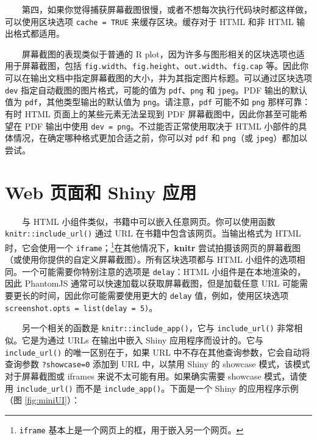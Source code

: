 \documentclass[
  12pt,
]{krantz}
\let\oldhref\href
\renewcommand{\href}[2]{#2\footnote{\url{#1}}}
\theoremstyle{definition}
\theoremstyle{definition}
\theoremstyle{definition}
\theoremstyle{definition}
\theoremstyle{remark}
\begin{document}
  第四，如果你觉得捕获屏幕截图很慢，或者不想每次执行代码块时都这样做，可以使用区块选项 \texttt{cache\ =\ TRUE} 来缓存区块。缓存对于 HTML 和非 HTML 输出格式都适用。

  屏幕截图的表现类似于普通的 R plot，因为许多与图形相关的区块选项也适用于屏幕截图，包括 \texttt{fig.width}、\texttt{fig.height}、\texttt{out.width}、\texttt{fig.cap} 等。因此你可以在输出文档中指定屏幕截图的大小，并为其指定图片标题。可以通过区块选项 \texttt{dev} 指定自动截图的图片格式，可能的值为 \texttt{pdf}、\texttt{png} 和 \texttt{jpeg}。PDF 输出的默认值为 \texttt{pdf}，其他类型输出的默认值为 \texttt{png}。请注意，\texttt{pdf} 可能不如 \texttt{png} 那样可靠：有时 HTML 页面上的某些元素无法呈现到 PDF 屏幕截图中，因此你甚至可能希望在 PDF 输出中使用 \texttt{dev\ =\ \textquotesingle{}png\textquotesingle{}}。不过能否正常使用取决于 HTML 小部件的具体情况，在确定哪种格式更加合适之前，你可以对 \texttt{pdf} 和 \texttt{png}（或 \texttt{jpeg}）都加以尝试。

\hypertarget{web-ux9875ux9762ux548c-shiny-ux5e94ux7528}{%
\section{Web 页面和 Shiny 应用}\label{web-ux9875ux9762ux548c-shiny-ux5e94ux7528}}

  与 HTML 小组件类似，书籍中可以嵌入任意网页。你可以使用函数 \texttt{knitr::include\_url()} 通过 URL 在书籍中包含该网页。当输出格式为 HTML 时，它会使用一个 \texttt{iframe}；\footnote{\texttt{iframe} 基本上是一个网页上的框，用于嵌入另一个网页。}在其他情况下，\textbf{knitr} 尝试拍摄该网页的屏幕截图（或使用你提供的自定义屏幕截图）。所有区块选项都与 HTML 小组件的选项相同。一个可能需要你特别注意的选项是 \texttt{delay}：HTML 小组件是在本地渲染的，因此 PhantomJS 通常可以快速加载以获取屏幕截图，但是加载任意 URL 可能需要更长的时间，因此你可能需要使用更大的 \texttt{delay} 值，例如，使用区块选项 \texttt{screenshot.opts\ =\ list(delay\ =\ 5)}。

  另一个相关的函数是 \texttt{knitr::include\_app()}，它与 \texttt{include\_url()} 非常相似。它是为通过 URLs 在输出中嵌入 Shiny 应用程序而设计的。它与 \texttt{include\_url()} 的唯一区别在于，如果 URL 中不存在其他查询参数，它会自动将查询参数 \texttt{?showcase=0} 添加到 URL 中，以禁用 Shiny 的 showcase 模式，该模式对于屏幕截图或 iframes 来说不太可能有用。如果确实需要 showcase 模式，请使用 \texttt{include\_url()} 而不是 \texttt{include\_app()}。下面是一个 Shiny 的应用程序示例（图 \ref{fig:miniUI}）：

\let\ooldhref\href
\let\href\oldhref
\end{document}
